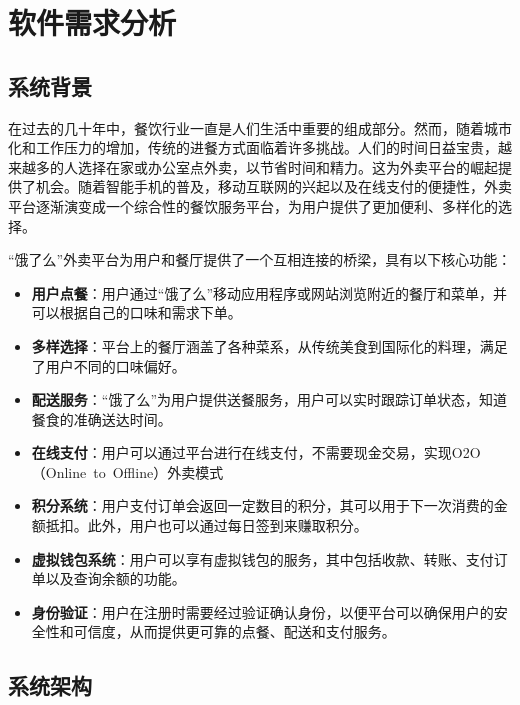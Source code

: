 \chapter{软件需求分析}

\section{系统背景}
在过去的几十年中，餐饮行业一直是人们生活中重要的组成部分。然而，随着城市化和工作压力的增加，传统的进餐方式面临着许多挑战。人们的时间日益宝贵，越来越多的人选择在家或办公室点外卖，以节省时间和精力。这为外卖平台的崛起提供了机会。随着智能手机的普及，移动互联网的兴起以及在线支付的便捷性，外卖平台逐渐演变成一个综合性的餐饮服务平台，为用户提供了更加便利、多样化的选择。

“饿了么”外卖平台为用户和餐厅提供了一个互相连接的桥梁，具有以下核心功能：
\begin{itemize}
    \item{\textbf{用户点餐}}：用户通过“饿了么”移动应用程序或网站浏览附近的餐厅和菜单，并可以根据自己的口味和需求下单。
    \item{\textbf{多样选择}}：平台上的餐厅涵盖了各种菜系，从传统美食到国际化的料理，满足了用户不同的口味偏好。
    \item{\textbf{配送服务}}：“饿了么”为用户提供送餐服务，用户可以实时跟踪订单状态，知道餐食的准确送达时间。
    \item{\textbf{在线支付}}：用户可以通过平台进行在线支付，不需要现金交易，实现O2O（Online~to~Offline）外卖模式
    \item{\textbf{积分系统}}：用户支付订单会返回一定数目的积分，其可以用于下一次消费的金额抵扣。此外，用户也可以通过每日签到来赚取积分。
    \item{\textbf{虚拟钱包系统}}：用户可以享有虚拟钱包的服务，其中包括收款、转账、支付订单以及查询余额的功能。
    \item{\textbf{身份验证}}：用户在注册时需要经过验证确认身份，以便平台可以确保用户的安全性和可信度，从而提供更可靠的点餐、配送和支付服务。
\end{itemize}

\section{系统架构}

